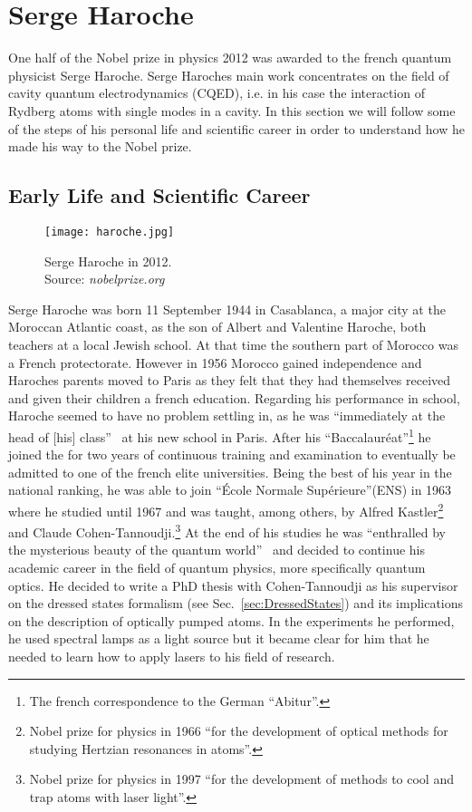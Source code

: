 \section{Serge Haroche}
\label{sec:Haroche}
One half of the Nobel prize in physics 2012 was awarded to the french quantum
physicist Serge Haroche. Serge Haroches main work concentrates on the field of
cavity quantum electrodynamics (CQED), i.e. in his case the interaction of
Rydberg atoms with single modes in a cavity. In this section we will follow some
of the steps of his personal life and scientific career in order to understand how he
made his way to the Nobel prize. 

\subsection{Early Life and Scientific Career}
\begin{wrapfigure}{r}{0.33\textwidth}
  \centering
  \texttt{[image: haroche.jpg]}
  \caption{Serge Haroche in 2012.\\ Source: \textit{nobelprize.org}}
\end{wrapfigure}
Serge Haroche was born 11 September 1944 in Casablanca, a major city at the
Moroccan Atlantic coast, as the son of Albert and
Valentine Haroche, both teachers at a local Jewish school. At that time the
southern part of Morocco was a French protectorate. However in 1956 Morocco
gained independence and Haroches parents moved to Paris as they felt that they
had themselves received and given their children a french education. Regarding
his performance in school, Haroche seemed to have no problem settling in, as he
was ``immediately at the head of [his] class''~\cite{shbio} at his new school in
Paris. After his ``Baccalauréat''\footnote{The french correspondence to the German
``Abitur''.} he joined the for two years of continuous training and examination to
eventually be admitted to one of the french elite universities. Being the best
of his year in the national ranking, he was able to join ``École Normale
Supérieure''(ENS) in 1963 where he studied until 1967 and was taught, among
others, by Alfred Kastler\footnote{Nobel prize for physics in 1966 ``for the
development of optical methods for studying Hertzian resonances in atoms''.} and
Claude Cohen-Tannoudji.\footnote{Nobel prize for physics in 1997 ``for the
development of methods to cool and trap atoms with laser light''.} At the end of
his studies he was ``enthralled by the mysterious beauty of the quantum
world''~\cite{shbio} and decided to continue his academic career in the field of
quantum physics, more specifically quantum optics. He decided to write a PhD
thesis with Cohen-Tannoudji as his supervisor on the dressed states
formalism (see
Sec.~\ref{sec:DressedStates}) and its implications on the description of
optically pumped atoms. In the experiments he performed, he used spectral lamps
as a light source but it became clear for him that he needed to learn how to
apply lasers to his field of research.

